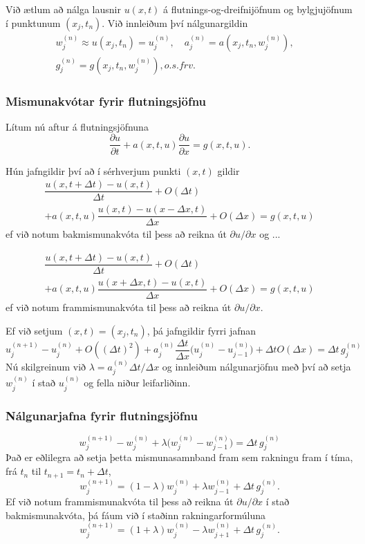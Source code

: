 \documentclass[icelandic,a4paper,12pt]{article}
\begin{document}
\smallskip
Við ætlum að nálga lausnir $u(x,t)$ á flutnings-og-dreifnijöfnum 
og bylgjujöfnum í punktunum $(x_j,t_n)$.   Við innleiðum því 
nálgunargildin
\begin{multline*}
w_j^{(n)}\approx u(x_j,t_n)=u_j^{(n)}, \quad
a_j^{(n)}=a(x_j,t_n,w_j^{(n)}), \quad \\
g_j^{(n)}=g(x_j,t_n,w_j^{(n)}), o.s.frv. 
\end{multline*}



\subsubsection{Mismunakvótar fyrir flutningsjöfnu} 
Lítum nú aftur á flutningsjöfnuna
$$
\dfrac{\partial u}{\partial t}
+a(x,t,u)\dfrac{\partial u}{\partial x}=g(x,t,u).
$$

\smallskip
Hún jafngildir því að í sérhverjum punkti $(x,t)$ gildir
\begin{multline*}
\dfrac{u(x,t+\Delta t)-u(x,t)}{\Delta t} +O(\Delta  t)\\
+a(x,t,u)\dfrac{u(x,t)-u(x-\Delta x,t)}{\Delta x}+O(\Delta x)
=g(x,t,u) 
\end{multline*}
ef við notum bakmismunakvóta til þess að reikna út $\partial
u/\partial x$ og ...



\begin{multline*}
\dfrac{u(x,t+\Delta t)-u(x,t)}{\Delta t} +O(\Delta  t)\\
+a(x,t,u)\dfrac{u(x+\Delta x,t)-u(x,t)}{\Delta x}+O(\Delta x)
=g(x,t,u) 
\end{multline*}
ef við notum frammismunakvóta til þess að reikna út $\partial
u/\partial x$.

\smallskip
Ef við setjum $(x,t)=(x_j,t_n)$, þá jafngildir fyrri jafnan 
$$
u_j^{(n+1)}-u_j^{(n)}+O((\Delta t)^2)
+a_j^{(n)}\dfrac{\Delta t}{\Delta
  x}\big(u_j^{(n)}-u_{j-1}^{(n)}\big)+\Delta tO(\Delta x)=\Delta
t\, g_j^{(n)}
$$
Nú skilgreinum við $\lambda=a_j^{(n)}{\Delta t}/{\Delta x}$ og
innleiðum nálgunarjöfnu með því að setja $w_j^{(n)}$ í stað
$u_j^{(n)}$ og fella niður leifarliðinn.



\subsubsection{Nálgunarjafna fyrir flutningsjöfnu} 
$$
w_j^{(n+1)}-w_j^{(n)}
+\lambda \big(w_j^{(n)}-w_{j-1}^{(n)}\big)=\Delta t\, g_j^{(n)}
$$
Það er eðlilegra að setja þetta mismunasamnband fram sem 
rakningu fram í tíma, frá $t_n$ til $t_{n+1}=t_n+\Delta t$,
$$
w_j^{(n+1)}=(1-\lambda) w_j^{(n)}+\lambda w_{j-1}^{(n)}+\Delta
t\, g_j^{(n)}. 
$$
Ef við notum frammismunakvóta til þess að reikna út 
$\partial u/\partial x$ í stað bakmismunakvóta, þá fáum við í 
staðinn rakningarformúluna
$$
w_j^{(n+1)}=(1+\lambda) w_j^{(n)}-\lambda w_{j+1}^{(n)}+\Delta
t\, g_j^{(n)}. 
$$
\end{document}
